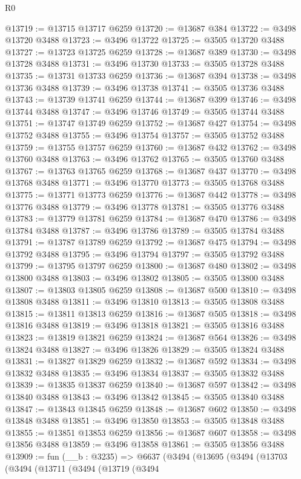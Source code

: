 \begin{lexlean}{R0}
\begin{coremodule}
@13719 := @13715 @13717 @6259
@13720 := @13687 @384
@13722 := @3498 @13720 @3488
@13723 := @3496 @13722
@13725 := @3505 @13720 @3488
@13727 := @13723 @13725 @6259
@13728 := @13687 @389
@13730 := @3498 @13728 @3488
@13731 := @3496 @13730
@13733 := @3505 @13728 @3488
@13735 := @13731 @13733 @6259
@13736 := @13687 @394
@13738 := @3498 @13736 @3488
@13739 := @3496 @13738
@13741 := @3505 @13736 @3488
@13743 := @13739 @13741 @6259
@13744 := @13687 @399
@13746 := @3498 @13744 @3488
@13747 := @3496 @13746
@13749 := @3505 @13744 @3488
@13751 := @13747 @13749 @6259
@13752 := @13687 @427
@13754 := @3498 @13752 @3488
@13755 := @3496 @13754
@13757 := @3505 @13752 @3488
@13759 := @13755 @13757 @6259
@13760 := @13687 @432
@13762 := @3498 @13760 @3488
@13763 := @3496 @13762
@13765 := @3505 @13760 @3488
@13767 := @13763 @13765 @6259
@13768 := @13687 @437
@13770 := @3498 @13768 @3488
@13771 := @3496 @13770
@13773 := @3505 @13768 @3488
@13775 := @13771 @13773 @6259
@13776 := @13687 @442
@13778 := @3498 @13776 @3488
@13779 := @3496 @13778
@13781 := @3505 @13776 @3488
@13783 := @13779 @13781 @6259
@13784 := @13687 @470
@13786 := @3498 @13784 @3488
@13787 := @3496 @13786
@13789 := @3505 @13784 @3488
@13791 := @13787 @13789 @6259
@13792 := @13687 @475
@13794 := @3498 @13792 @3488
@13795 := @3496 @13794
@13797 := @3505 @13792 @3488
@13799 := @13795 @13797 @6259
@13800 := @13687 @480
@13802 := @3498 @13800 @3488
@13803 := @3496 @13802
@13805 := @3505 @13800 @3488
@13807 := @13803 @13805 @6259
@13808 := @13687 @500
@13810 := @3498 @13808 @3488
@13811 := @3496 @13810
@13813 := @3505 @13808 @3488
@13815 := @13811 @13813 @6259
@13816 := @13687 @505
@13818 := @3498 @13816 @3488
@13819 := @3496 @13818
@13821 := @3505 @13816 @3488
@13823 := @13819 @13821 @6259
@13824 := @13687 @564
@13826 := @3498 @13824 @3488
@13827 := @3496 @13826
@13829 := @3505 @13824 @3488
@13831 := @13827 @13829 @6259
@13832 := @13687 @592
@13834 := @3498 @13832 @3488
@13835 := @3496 @13834
@13837 := @3505 @13832 @3488
@13839 := @13835 @13837 @6259
@13840 := @13687 @597
@13842 := @3498 @13840 @3488
@13843 := @3496 @13842
@13845 := @3505 @13840 @3488
@13847 := @13843 @13845 @6259
@13848 := @13687 @602
@13850 := @3498 @13848 @3488
@13851 := @3496 @13850
@13853 := @3505 @13848 @3488
@13855 := @13851 @13853 @6259
@13856 := @13687 @607
@13858 := @3498 @13856 @3488
@13859 := @3496 @13858
@13861 := @3505 @13856 @3488
@13909 := fun (__b : @3235) =>
  @6637
    (@3494
      (@13695
        (@3494
          (@13703
            (@3494
              (@13711
                (@3494
                  (@13719
                    (@3494

\end{coremodule}
\end{lexlean}
